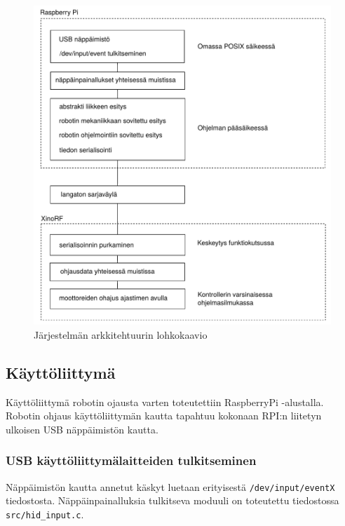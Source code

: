 \documentclass[]{article} %
\numberwithin{equation}{section}
\numberwithin{figure}{section}
\numberwithin{table}{section}
\begin{document}
\begin{figure}
    \centering
    \caption{Järjestelmän arkkitehtuurin lohkokaavio}
    \label{fig:architechture}
    \includegraphics[scale=0.5]{./architechture.pdf}
\end{figure}

\subsection{Käyttöliittymä}
\label{sec:Kayttoliittyma}

Käyttöliittymä robotin ojausta varten toteutettiin RaspberryPi -alustalla.
Robotin ohjaus käyttöliittymän kautta tapahtuu kokonaan RPI:n liitetyn ulkoisen USB näppäimistön kautta.

\subsubsection{USB käyttöliittymälaitteiden tulkitseminen}
\label{sub:USB kayttoliittymalaitteiden tulkitseminen}

Näppäimistön kautta annetut käskyt luetaan erityisestä \verb+/dev/input/eventX+ tiedostosta. Näppäinpainalluksia tulkitseva moduuli on toteutettu tiedostossa \verb+src/hid_input.c+.
\end{document}
